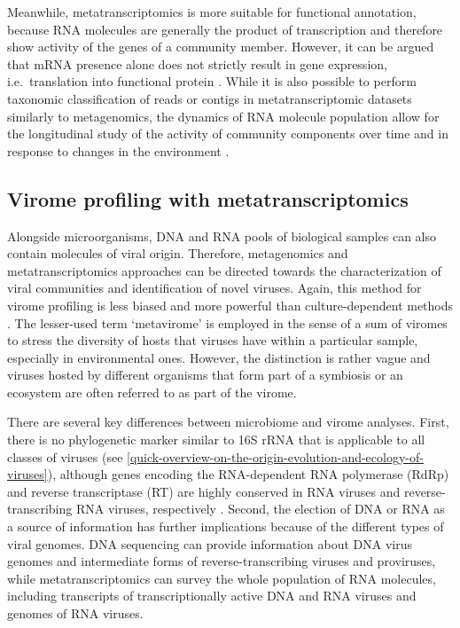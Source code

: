 \documentclass[
  openany]{book}
\begin{document}
Meanwhile, metatranscriptomics is more suitable for functional annotation, because RNA molecules are generally the product of transcription and therefore show activity of the genes of a community member. However, it can be argued that mRNA presence alone does not strictly result in gene expression, i.e.~translation into functional protein \autocite{Vogel2012}. While it is also possible to perform taxonomic classification of reads or contigs in metatranscriptomic datasets similarly to metagenomics, the dynamics of RNA molecule population allow for the longitudinal study of the activity of community components over time and in response to changes in the environment \autocite{Shakya2019}.

\hypertarget{virome-profiling-with-metatranscriptomics}{%
\subsection{Virome profiling with metatranscriptomics}\label{virome-profiling-with-metatranscriptomics}}

Alongside microorganisms, DNA and RNA pools of biological samples can also contain molecules of viral origin. Therefore, metagenomics and metatranscriptomics approaches can be directed towards the characterization of viral communities and identification of novel viruses. Again, this method for virome profiling is less biased and more powerful than culture-dependent methods \autocite{Mokili2012}. The lesser-used term `metavirome' is employed in the sense of a sum of viromes to stress the diversity of hosts that viruses have within a particular sample, especially in environmental ones. However, the distinction is rather vague and viruses hosted by different organisms that form part of a symbiosis \autocite{Garcia-Lopez2019} or an ecosystem \autocite{Kim2017} are often referred to as part of the virome.

There are several key differences between microbiome and virome analyses. First, there is no phylogenetic marker similar to 16S rRNA that is applicable to all classes of viruses \autocite{Rohwer2002} (see \ref{quick-overview-on-the-origin-evolution-and-ecology-of-viruses}), although genes encoding the RNA-dependent RNA polymerase (RdRp) and reverse transcriptase (RT) are highly conserved in RNA viruses and reverse-transcribing RNA viruses, respectively \autocite{Koonin2009}. Second, the election of DNA or RNA as a source of information has further implications because of the different types of viral genomes. DNA sequencing can provide information about DNA virus genomes and intermediate forms of reverse-transcribing viruses and proviruses, while metatranscriptomics can survey the whole population of RNA molecules, including transcripts of transcriptionally active DNA and RNA viruses and genomes of RNA viruses.
\end{document}
